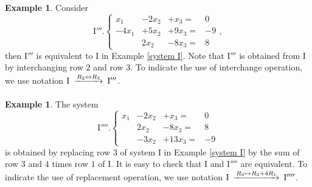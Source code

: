 \documentclass[12pt,letterpaper]{book}
\numberwithin{equation}{section}
\theoremstyle{definition}
\newtheorem{example}[thm]{\textbf{Example}}
\begin{document}
\begin{example} Consider
$$\text{I$'''$.}\left\{\begin{array}{rrrr}
x_1&-2x_2&+x_3=&0 \\ -4x_1&+5x_2&+9x_3=&-9
\\ &2x_2 &-8x_3=&8  \end{array}\right. , $$
then I$'''$ is equivalent to I in Example \ref{system I}. Note that I$'''$ is obtained from I by interchanging row $2$ and row $3$. To indicate the use of interchange operation, we use notation $\begin{CD} \text{I} @>R_2 \leftrightarrow
R_3>\quad > \text{I$'''$}\end{CD}$.
\end{example}

\begin{example} The system
$$\text{I$''''$.}\left\{\begin{array}{rrrr}
x_1&-2x_2&+x_3=&0
\\ &2x_2 &-8x_3=&8 \\ &-3x_2&+13x_3=&-9 \end{array}\right.$$
is obtained by replacing row 3 of system I in Example \ref{system I} by
the sum of row 3 and $4$ times row $1$ of I. It is easy to check that I and I$''''$ are equivalent. To indicate the use of replacement operation, we use notation $\begin{CD} \text{I} @>R_3 \mapsto R_3+4R_1>\quad > \text{I$''''$} \end{CD}$.
\end{example}
\end{document}
